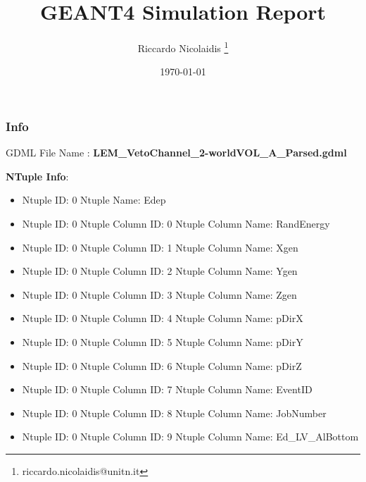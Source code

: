 \documentclass[8pt]{beamer}
\title{GEANT4 Simulation Report}
\author{Riccardo Nicolaidis \footnote{riccardo.nicolaidis@unitn.it}}
\date{\today}
\begin{document}
        
            \begin{frame}
                \titlepage
            \end{frame}
            
            \begin{frame}
                \frametitle{Info}
            
                \centering
                GDML File Name : \textbf{ LEM\_VetoChannel\_2-worldVOL\_A\_Parsed.gdml}
                
                
                \vspace{2 cm}
                \textbf{NTuple Info}:
                \vspace{1 cm}
                
        \begin{itemize}
        
        \item Ntuple ID: 0 Ntuple Name: Edep
        
        \item Ntuple ID: 0 Ntuple Column ID: 0 Ntuple Column Name: RandEnergy
        
        \item Ntuple ID: 0 Ntuple Column ID: 1 Ntuple Column Name: Xgen
        
        \item Ntuple ID: 0 Ntuple Column ID: 2 Ntuple Column Name: Ygen
        
        \item Ntuple ID: 0 Ntuple Column ID: 3 Ntuple Column Name: Zgen
        
        \item Ntuple ID: 0 Ntuple Column ID: 4 Ntuple Column Name: pDirX
        
        \item Ntuple ID: 0 Ntuple Column ID: 5 Ntuple Column Name: pDirY
        
        \item Ntuple ID: 0 Ntuple Column ID: 6 Ntuple Column Name: pDirZ
        
        \item Ntuple ID: 0 Ntuple Column ID: 7 Ntuple Column Name: EventID
        
        \item Ntuple ID: 0 Ntuple Column ID: 8 Ntuple Column Name: JobNumber
        
        \item Ntuple ID: 0 Ntuple Column ID: 9 Ntuple Column Name: Ed\_LV\_AlBottom
        

\end{itemize}
\end{frame}
\end{document}
